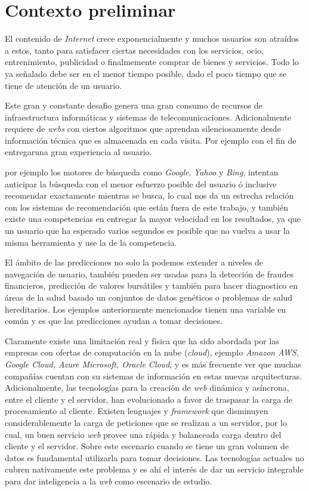 
\section{Contexto preliminar}\label{sec:preliminar}

	
El contenido de \emph{Internet} crece exponencialmente y muchos usuarios son atraídos a estos, tanto para satisfacer ciertas necesidades con los servicios, ocio, entrenimiento,  publicidad o finalmemente comprar de bienes y servicios.
Todo lo ya señalado debe ser en el menor tiempo posible, dado el poco tiempo que se tiene de atención de un usuario.

Este gran y constante desafio genera una gran consumo de recursos de infraestructura informáticas y sistemas de telecomunicaciones. Adicionalmente  requiere de \emph{webs} con ciertos algoritmos que aprendan silenciosamente desde información técnica que es almacenada en cada visita. Por ejemplo con el fin de entregaruna gran experiencia al usuario.

 por ejemplo los motores de búsqueda como \emph{Google}, \emph{Yahoo} y \emph{Bing}, intentan anticipar la búsqueda con el menor esfuerzo posible del usuario ó inclusive recomendar exactamente mientras se busca, lo cual nos da un estrecha relación con los sistemas de recomendación que están fuera de este trabajo, y también existe una competencias en entregar la mayor velocidad en los resultados, ya que un usuario que ha esperado varios segundos es posible que no vuelva a usar la misma herramienta y use la de la competencia.


{El ámbito de las predicciones no solo la podemos extender a niveles de navegación de usuario, también pueden ser usadas para la detección de fraudes financieros, predicción de valores bursátiles y también para hacer diagnostico en áreas de la salud basado un conjuntos de datos genéticos o problemas de salud hereditarios. Los ejemplos anteriormente mencionados tienen una variable en común y es que las predicciones ayudan a tomar decisiones.}\label{ejemplos-casos-contextopreliminar}

 Claramente existe una limitación real y física que ha sido abordada por las empresas con ofertas de computación en la nube (\emph{cloud}), ejemplo \emph{Amazon AWS, Google Cloud, Azure Microsoft, Oracle Cloud}, y es más frecuente ver que muchas compañías cuentan con su sistemas de información en estas nuevas arquitecturas. Adicionalmente, las tecnologías para la creación de \emph{web} dinámica y asíncrona, entre el cliente y el servidor, han evolucionado a favor de traspasar la carga de procesamiento al cliente. Existen lenguajes y \emph{framework} que disminuyen considerablemente la carga de peticiones que se realizan a un servidor, por lo cual, un buen servicio \emph{web} provee una rápida y balanceada carga dentro del cliente y el servidor. Sobre este escenario cuando se tiene un gran volumen de datos es fundamental utilizarla para tomar decisiones. Las tecnologías actuales no cubren nativamente este problema y es ahí el interés de dar un servicio integrable para dar inteligencia a la \emph{web} como escenario de estudio.

